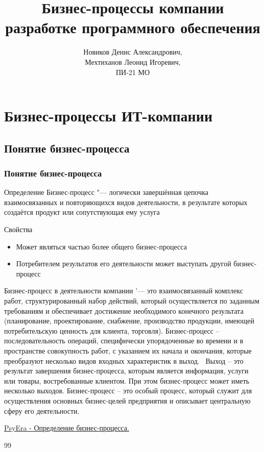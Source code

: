 \documentclass{../industrial-development}
\title{Бизнес-процессы компании  разработке программного обеспечения}
\author{Новиков Денис Александрович, \\Мехтиханов Леонид Игоревич, \\ПИ-21 МО}
\date{}
\begin{document}
\begin{frame}
  \titlepage
\end{frame}


\section{Бизнес-процессы ИТ-компании}

\subsection{Понятие бизнес-процесса}


\begin{frame} \frametitle{Понятие бизнес-процесса}
	\begin{block}{Определение}
		\alert{Бизнес-процесс} "--- логически завершённая цепочка взаимосвязанных и повторяющихся видов деятельности, в результате которых создаётся продукт или сопутствующая ему услуга
	\end{block}
	\begin{block}{Свойства}
		\begin{itemize}
			\item Может являться частью более общего бизнес-процесса
			\item Потребителем результатов его деятельности может выступать другой бизнес-процесс
		\end{itemize}
	\end{block}
\end{frame}
\lecturenotes
Бизнес-процесс в деятельности компании '--- это взаимосвязанный комплекс работ, структурированный набор действий, который осуществляется по заданным требованиям и обеспечивает достижение необходимого конечного результата (планирование, проектирование, снабжение, производство продукции, имеющей потребительскую ценность для клиента, торговля).
Бизнес-процесс – последовательность операций, специфически упорядоченные во времени и в пространстве совокупность работ, с указанием их начала и окончания, которые преобразуют несколько видов входных характеристик в выход.~\cite{PsyEra} Выход – это результат завершения бизнес-процесса, которым является информация, услуги или товары, востребованные клиентом. При этом бизнес-процесс может иметь несколько выходов.
Бизнес-процесс – это особый процесс, который служит для осуществления основных бизнес-целей предприятия и описывает центральную сферу его деятельности. 
\lecturenotes
\begin{thebibliography}{99}
 \href{https://psyera.ru/3694/opredelenie-biznes-processal}{PsyEra - Определение бизнес-процесса.}
\end{thebibliography}{99}
\end{document}
